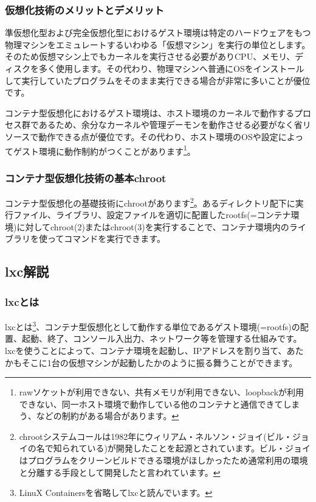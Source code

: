 \documentclass[mingoth,a4paper]{jsarticle}
\begin{document}
\subsubsection{仮想化技術のメリットとデメリット}

準仮想化型および完全仮想化型におけるゲスト環境は特定のハードウェアをもつ物理マシンをエミュレートするいわゆる「仮想マシン」を実行の単位とします。そのため仮想マシン上でもカーネルを実行させる必要がありCPU、メモリ、ディスクを多く使用します。その代わり、物理マシンへ普通にOSをインストールして実行していたプログラムをそのまま実行できる場合が非常に多いことが優位です。

コンテナ型仮想化におけるゲスト環境は、ホスト環境のカーネルで動作するプロセス群であるため、余分なカーネルや管理デーモンを動作させる必要がなく省リソースで動作できる点が優位です。その代わり、ホスト環境のOSや設定によってゲスト環境に動作制約がつくことがあります\footnote{rawソケットが利用できない、共有メモリが利用できない、loopbackが利用できない、同一ホスト環境で動作している他のコンテナと通信できてしまう、などの制約がある場合があります。}。

\subsubsection{コンテナ型仮想化技術の基本chroot}

コンテナ型仮想化の基礎技術にchrootがあります\footnote{chrootシステムコールは1982年にウィリアム・ネルソン・ジョイ(ビル・ジョイの名で知られている)が開発したことを起源とされています。ビル・ジョイはプログラムをクリーンビルドできる環境がほしかったため通常利用の環境と分離する手段として開発したと言われています。}。あるディレクトリ配下に実行ファイル、ライブラリ、設定ファイルを適切に配置したrootfs(=コンテナ環境)に対してchroot(2)またはchroot(3)を実行することで、コンテナ環境内のライブラリを使ってコマンドを実行できます。

\subsection{lxc解説}
\subsubsection{lxcとは}

lxcとは\footnote{LinuX Containersを省略してlxcと読んでいます。}、コンテナ型仮想化として動作する単位であるゲスト環境(=rootfs)の配置、起動、終了、コンソール入出力、ネットワーク等を管理する仕組みです。
lxcを使うことによって、コンテナ環境を起動し、IPアドレスを割り当て、あたかもそこに1台の仮想マシンが起動したかのように振る舞うことができます。
\end{document}
